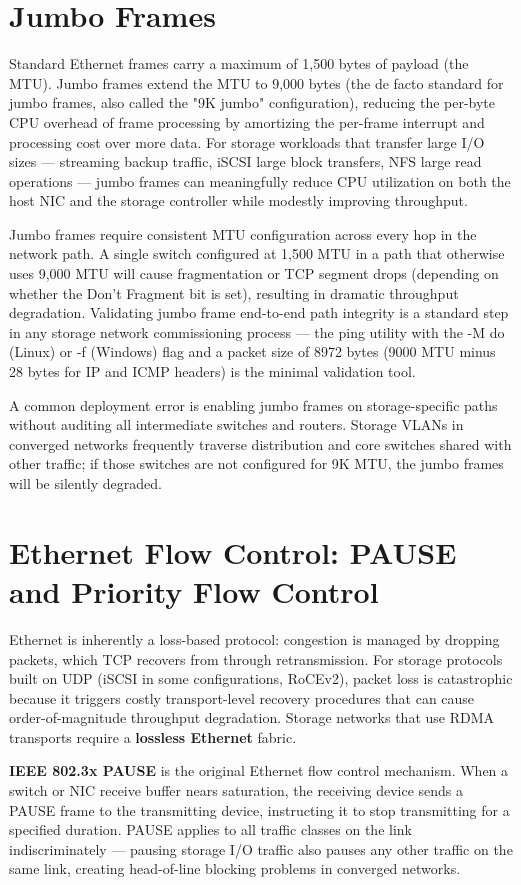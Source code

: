 \section{Jumbo Frames}
Standard Ethernet frames carry a maximum of 1,500 bytes of payload (the MTU). Jumbo frames extend the MTU to 9,000 bytes (the de facto standard for jumbo frames, also called the "9K jumbo" configuration), reducing the per-byte CPU overhead of frame processing by amortizing the per-frame interrupt and processing cost over more data. For storage workloads that transfer large I/O sizes --- streaming backup traffic, iSCSI large block transfers, NFS large read operations --- jumbo frames can meaningfully reduce CPU utilization on both the host NIC and the storage controller while modestly improving throughput.

Jumbo frames require consistent MTU configuration across every hop in the network path. A single switch configured at 1,500 MTU in a path that otherwise uses 9,000 MTU will cause fragmentation or TCP segment drops (depending on whether the Don't Fragment bit is set), resulting in dramatic throughput degradation. Validating jumbo frame end-to-end path integrity is a standard step in any storage network commissioning process --- the ping utility with the -M do (Linux) or -f (Windows) flag and a packet size of 8972 bytes (9000 MTU minus 28 bytes for IP and ICMP headers) is the minimal validation tool.

A common deployment error is enabling jumbo frames on storage-specific paths without auditing all intermediate switches and routers. Storage VLANs in converged networks frequently traverse distribution and core switches shared with other traffic; if those switches are not configured for 9K MTU, the jumbo frames will be silently degraded.

\section{Ethernet Flow Control: PAUSE and Priority Flow Control}
Ethernet is inherently a loss-based protocol: congestion is managed by dropping packets, which TCP recovers from through retransmission. For storage protocols built on UDP (iSCSI in some configurations, RoCEv2), packet loss is catastrophic because it triggers costly transport-level recovery procedures that can cause order-of-magnitude throughput degradation. Storage networks that use RDMA transports require a \textbf{lossless Ethernet} fabric.

\textbf{IEEE 802.3x PAUSE} is the original Ethernet flow control mechanism. When a switch or NIC receive buffer nears saturation, the receiving device sends a PAUSE frame to the transmitting device, instructing it to stop transmitting for a specified duration. PAUSE applies to all traffic classes on the link indiscriminately --- pausing storage I/O traffic also pauses any other traffic on the same link, creating head-of-line blocking problems in converged networks.

